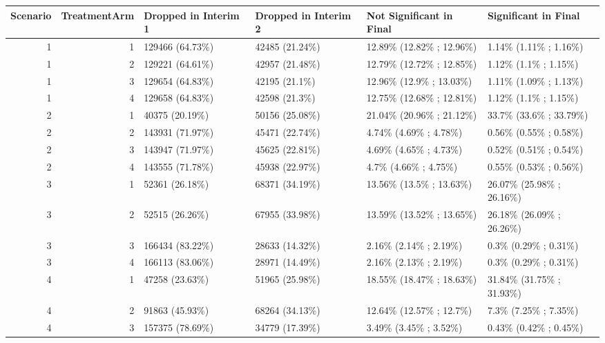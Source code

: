 \documentclass[11pt, a4paper]{article}\usepackage[]{graphicx}\usepackage[]{xcolor}
\begin{document}
{\begin{landscape}
\begin{table}[ht]
\centering
\begin{tabular}{rrllll}
  \hline
Scenario & TreatmentArm & Dropped in Interim 1 & Dropped in Interim 2 & Not Significant in Final & Significant in Final \\ 
  \hline
  1 &   1 & 129466 (64.73\%) & 42485 (21.24\%) & 12.89\% (12.82\% ; 12.96\%) & 1.14\% (1.11\% ; 1.16\%) \\ 
    1 &   2 & 129221 (64.61\%) & 42957 (21.48\%) & 12.79\% (12.72\% ; 12.85\%) & 1.12\% (1.1\% ; 1.15\%) \\ 
    1 &   3 & 129654 (64.83\%) & 42195 (21.1\%) & 12.96\% (12.9\% ; 13.03\%) & 1.11\% (1.09\% ; 1.13\%) \\ 
    1 &   4 & 129658 (64.83\%) & 42598 (21.3\%) & 12.75\% (12.68\% ; 12.81\%) & 1.12\% (1.1\% ; 1.15\%) \\ 
   \hline 
  2 &   1 & 40375 (20.19\%) & 50156 (25.08\%) & 21.04\% (20.96\% ; 21.12\%) & 33.7\% (33.6\% ; 33.79\%) \\ 
    2 &   2 & 143931 (71.97\%) & 45471 (22.74\%) & 4.74\% (4.69\% ; 4.78\%) & 0.56\% (0.55\% ; 0.58\%) \\ 
    2 &   3 & 143947 (71.97\%) & 45625 (22.81\%) & 4.69\% (4.65\% ; 4.73\%) & 0.52\% (0.51\% ; 0.54\%) \\ 
    2 &   4 & 143555 (71.78\%) & 45938 (22.97\%) & 4.7\% (4.66\% ; 4.75\%) & 0.55\% (0.53\% ; 0.56\%) \\ 
   \hline 
  3 &   1 & 52361 (26.18\%) & 68371 (34.19\%) & 13.56\% (13.5\% ; 13.63\%) & 26.07\% (25.98\% ; 26.16\%) \\ 
    3 &   2 & 52515 (26.26\%) & 67955 (33.98\%) & 13.59\% (13.52\% ; 13.65\%) & 26.18\% (26.09\% ; 26.26\%) \\ 
    3 &   3 & 166434 (83.22\%) & 28633 (14.32\%) & 2.16\% (2.14\% ; 2.19\%) & 0.3\% (0.29\% ; 0.31\%) \\ 
    3 &   4 & 166113 (83.06\%) & 28971 (14.49\%) & 2.16\% (2.13\% ; 2.19\%) & 0.3\% (0.29\% ; 0.31\%) \\ 
   \hline 
  4 &   1 & 47258 (23.63\%) & 51965 (25.98\%) & 18.55\% (18.47\% ; 18.63\%) & 31.84\% (31.75\% ; 31.93\%) \\ 
    4 &   2 & 91863 (45.93\%) & 68264 (34.13\%) & 12.64\% (12.57\% ; 12.7\%) & 7.3\% (7.25\% ; 7.35\%) \\ 
    4 &   3 & 157375 (78.69\%) & 34779 (17.39\%) & 3.49\% (3.45\% ; 3.52\%) & 0.43\% (0.42\% ; 0.45\%) \\ 

\end{tabular}
\end{table}
\end{landscape}}
\end{document}
